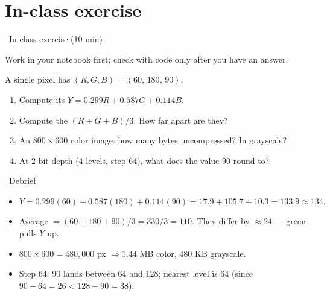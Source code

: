 \documentclass[10pt,aspectratio=169]{beamer}
\begin{document}
\section{In-class exercise}

\begin{frame}{\faPen~In-class exercise (10 min)}
  \begin{infobox}
    Work in your notebook first; check with code only after you have an answer.
  \end{infobox}
  A single pixel has \((R,G,B) = (60,\,180,\,90)\).
  \begin{enumerate}
    \item Compute its  \(Y = 0.299R + 0.587G + 0.114B\).
    \item Compute the  \((R+G+B)/3\). How far apart are they?
    \item An $800\times600$ color image: how many bytes uncompressed? In grayscale?
    \item At 2-bit depth (4 levels, step 64), what does the value \(90\) round to?
  \end{enumerate}
\end{frame}

\begin{frame}{\faPen~Debrief}
  \begin{itemize}
    \item \(Y = 0.299(60) + 0.587(180) + 0.114(90) = 17.9 + 105.7 + 10.3 = 133.9 \approx 134.\)
    \item Average \(= (60+180+90)/3 = 330/3 = 110.\) They differ by \(\approx 24\) — green pulls \(Y\) up.
    \item \(800\times600 = 480{,}000\) px \(\Rightarrow 1.44\) MB color, \(480\) KB grayscale.
    \item Step 64: \(90\) lands between \(64\) and \(128\); nearest level is \(64\) (since \(90-64=26 < 128-90=38\)).
  \end{itemize}
\end{frame}
\end{document}
